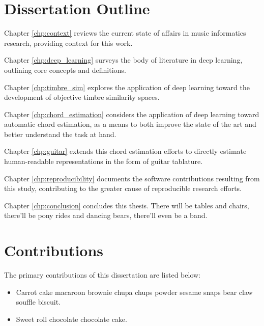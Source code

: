 \section{Dissertation Outline}
\label{sec:outline}
\begin{description}

\item Chapter \ref{chp:context} reviews the current state of affairs in music informatics research, providing context for this work.

\item Chapter \ref{chp:deep_learning} surveys the body of literature in deep learning, outlining core concepts and definitions.

\item Chapter \ref{chp:timbre_sim} explores the application of deep learning toward the development of objective timbre similarity spaces.

\item Chapter \ref{chp:chord_estimation} considers the application of deep learning toward automatic chord estimation, as a means to both improve the state of the art and better understand the task at hand.

\item Chapter \ref{chp:guitar} extends this chord estimation efforts to directly estimate human-readable representations in the form of guitar tablature.

\item Chapter \ref{chp:reproducibility} documents the software contributions resulting from this study, contributing to the greater cause of reproducible research efforts.

\item Chapter \ref{chp:conclusion} concludes this thesis.
There will be tables and chairs, there'll be pony rides and dancing bears, there'll even be a band.

\end{description}

\section{Contributions}
The primary contributions of this dissertation are listed below:

\begin{itemize}
  \onehalfspacing
\item Carrot cake macaroon brownie chupa chups powder sesame snaps bear claw souffle biscuit.
\item Sweet roll chocolate chocolate cake.
\end{itemize}

